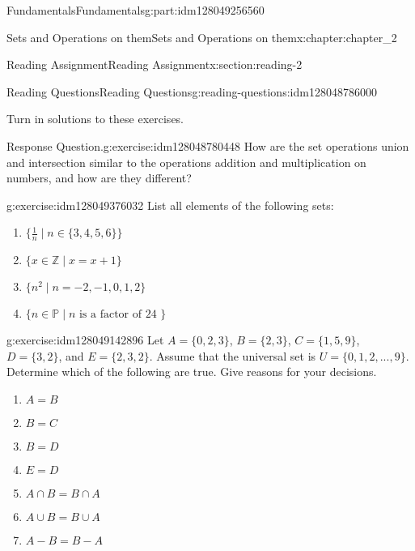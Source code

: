 \documentclass[oneside,10pt,]{book}
\numberwithin{equation}{section}
\begin{document}
\begin{partptx}{Fundamentals}{}{Fundamentals}{}{}{g:part:idm128049256560}
\begin{chapterptx}{Sets and Operations on them}{}{Sets and Operations on them}{}{}{x:chapter:chapter_2}
\begin{sectionptx}{Reading Assignment}{}{Reading Assignment}{}{}{x:section:reading-2}
%
%
\typeout{************************************************}
\typeout{************************************************}
%
\begin{reading-questions-subsection-numberless}{Reading Questions}{}{Reading Questions}{}{}{g:reading-questions:idm128048786000}
\begin{introduction}{}%
Turn in solutions to these exercises.%
\end{introduction}%
\begin{divisionexercise}{1}{Response Question.}{}{g:exercise:idm128048780448}%
How are the set operations union and intersection similar to the operations addition and multiplication on numbers, and how are they different?%
\end{divisionexercise}%
\begin{divisionexercise}{2}{}{}{g:exercise:idm128049376032}%
List all elements of the following sets:%
\begin{enumerate}[label=(\alph*)]
\item{}\(\displaystyle \{\frac{1}{n} \mid n \in \{3,4,5,6\}\}\)%
\item{}\(\displaystyle \{x \in \mathbb{Z} \mid x = x+1 \}\)%
\item{}\(\displaystyle \{n^2 \mid  n = -2, -1, 0, 1, 2\}\)%
\item{}\(\displaystyle \{n \in  \mathbb{P} \mid n \textrm{ is a  factor of  24 }\}\)%
\end{enumerate}
%
\end{divisionexercise}%
\begin{divisionexercise}{3}{}{}{g:exercise:idm128049142896}%
Let \(A = \{0, 2, 3\}\), \(B = \{2, 3\}\), \(C = \{1, 5, 9\}\), \(D = \{3, 2\}\), and \(E = \{2, 3, 2\}\). Assume that the universal set is \(U = \{0, 1, 2, . . . , 9\}\). Determine which of the following are true. Give reasons for your decisions.%
\begin{multicols}{2}
\begin{enumerate}[label=(\alph*)]
\item{}\(\displaystyle A = B\)%
\item{}\(\displaystyle B = C\)%
\item{}\(\displaystyle B = D\)%
\item{}\(\displaystyle E=D\)%
\item{}\(\displaystyle A\cap B = B\cap A\)%
\item{}\(\displaystyle A \cup  B = B \cup  A\)%
\item{}\(\displaystyle A-B = B-A\)%

\end{enumerate}
\end{multicols}
\end{divisionexercise}
\end{reading-questions-subsection-numberless}
\end{sectionptx}
\end{chapterptx}
\end{partptx}
\end{document}
